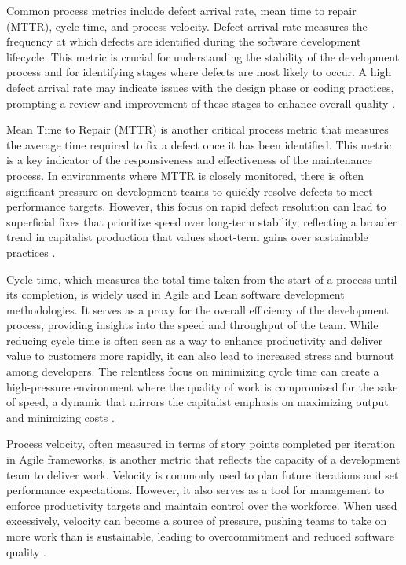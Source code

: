 \begin{refsection}
Common process metrics include defect arrival rate, mean time to repair (MTTR), cycle time, and process velocity. Defect arrival rate measures the frequency at which defects are identified during the software development lifecycle. This metric is crucial for understanding the stability of the development process and for identifying stages where defects are most likely to occur. A high defect arrival rate may indicate issues with the design phase or coding practices, prompting a review and improvement of these stages to enhance overall quality \cite[pp.~451-453]{Pressman2014SoftwareEngineering}.

Mean Time to Repair (MTTR) is another critical process metric that measures the average time required to fix a defect once it has been identified. This metric is a key indicator of the responsiveness and effectiveness of the maintenance process. In environments where MTTR is closely monitored, there is often significant pressure on development teams to quickly resolve defects to meet performance targets. However, this focus on rapid defect resolution can lead to superficial fixes that prioritize speed over long-term stability, reflecting a broader trend in capitalist production that values short-term gains over sustainable practices \cite[pp.~95-97]{Parnas2011SoftwareFundamentals}.

Cycle time, which measures the total time taken from the start of a process until its completion, is widely used in Agile and Lean software development methodologies. It serves as a proxy for the overall efficiency of the development process, providing insights into the speed and throughput of the team. While reducing cycle time is often seen as a way to enhance productivity and deliver value to customers more rapidly, it can also lead to increased stress and burnout among developers. The relentless focus on minimizing cycle time can create a high-pressure environment where the quality of work is compromised for the sake of speed, a dynamic that mirrors the capitalist emphasis on maximizing output and minimizing costs \cite[pp.~67-70]{Middleton2012LeanSoftware}.

Process velocity, often measured in terms of story points completed per iteration in Agile frameworks, is another metric that reflects the capacity of a development team to deliver work. Velocity is commonly used to plan future iterations and set performance expectations. However, it also serves as a tool for management to enforce productivity targets and maintain control over the workforce. When used excessively, velocity can become a source of pressure, pushing teams to take on more work than is sustainable, leading to overcommitment and reduced software quality \cite[pp.~142-145]{Cohn2010AgileEstimating}.


\end{refsection}
